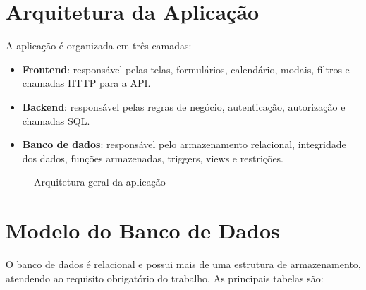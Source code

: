 \documentclass[12pt,a4paper]{article}
\begin{document}
\section{Arquitetura da Aplicação}

A aplicação é organizada em três camadas:

\begin{itemize}[leftmargin=*]
  \item \textbf{Frontend}: responsável pelas telas, formulários, calendário, modais, filtros e chamadas HTTP para a API.
  \item \textbf{Backend}: responsável pelas regras de negócio, autenticação, autorização e chamadas SQL.
  \item \textbf{Banco de dados}: responsável pelo armazenamento relacional, integridade dos dados, funções armazenadas, triggers, views e restrições.
\end{itemize}

\begin{figure}[H]
\centering
{}
\caption{Arquitetura geral da aplicação}
\end{figure}

\section{Modelo do Banco de Dados}

O banco de dados é relacional e possui mais de uma estrutura de armazenamento, atendendo ao requisito obrigatório do trabalho. As principais tabelas são:
\end{document}

